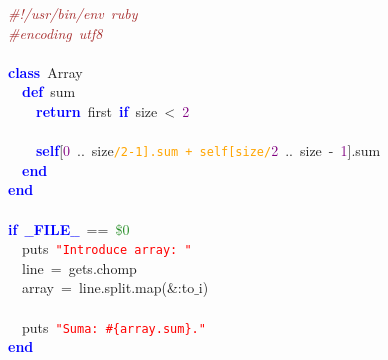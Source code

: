 \noindent
\mbox{}\textit{\textcolor{Brown}{\#!/usr/bin/env\ ruby}} \\
\mbox{}\textit{\textcolor{Brown}{\#encoding\ utf8}} \\
\mbox{} \\
\mbox{}\textbf{\textcolor{Blue}{class}}\ Array \\
\mbox{}\ \ \textbf{\textcolor{Blue}{def}}\ sum \\
\mbox{}\ \ \ \ \textbf{\textcolor{Blue}{return}}\ first\ \textbf{\textcolor{Blue}{if}}\ size\ \textcolor{BrickRed}{\textless{}}\ \textcolor{Purple}{2} \\
\mbox{} \\
\mbox{}\ \ \ \ \textbf{\textcolor{Blue}{self}}\textcolor{BrickRed}{[}\textcolor{Purple}{0}\ \textcolor{BrickRed}{..}\ size\texttt{\textcolor{Orange}{/2-1].sum\ +\ self[size/}}\textcolor{Purple}{2}\ \textcolor{BrickRed}{..}\ size\ \textcolor{BrickRed}{-}\ \textcolor{Purple}{1}\textcolor{BrickRed}{].}sum \\
\mbox{}\ \ \textbf{\textcolor{Blue}{end}} \\
\mbox{}\textbf{\textcolor{Blue}{end}} \\
\mbox{} \\
\mbox{}\textbf{\textcolor{Blue}{if}}\ \textbf{\textcolor{Blue}{$\_$$\_$FILE$\_$$\_$}}\ \textcolor{BrickRed}{==}\ \textcolor{ForestGreen}{\$0} \\
\mbox{}\ \ puts\ \texttt{\textcolor{Red}{"{}Introduce\ array:\ "{}}} \\
\mbox{}\ \ line\ \textcolor{BrickRed}{=}\ gets\textcolor{BrickRed}{.}chomp \\
\mbox{}\ \ array\ \textcolor{BrickRed}{=}\ line\textcolor{BrickRed}{.}split\textcolor{BrickRed}{.}map\textcolor{BrickRed}{(\&:}to$\_$i\textcolor{BrickRed}{)} \\
\mbox{} \\
\mbox{}\ \ puts\ \texttt{\textcolor{Red}{"{}Suma:\ \#\{array.sum\}."{}}} \\
\mbox{}\textbf{\textcolor{Blue}{end}}
